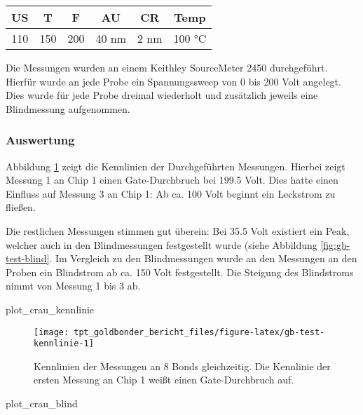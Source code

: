 \documentclass[
  paper=a4,
  ,captions=tableheading
]{scrartcl}
\newenvironment{Shaded}{\begin{snugshade}}{\end{snugshade}}
\newcommand{\NormalTok}[1]{#1}
\begin{document}
\begin{tabular}{c|c|c|c|c|c}
\hline
US & T & F & AU & CR & Temp\\
\hline
110 & 150 & 200 & 40 nm & 2 nm & 100 °C\\
\hline
\end{tabular}

Die Messungen wurden an einem Keithley SourceMeter 2450 durchgeführt. Hierfür wurde an jede Probe ein Spannungssweep von 0 bis 200 Volt angelegt. Dies wurde für jede Probe dreimal wiederholt und zusätzlich jeweils eine Blindmessung aufgenommen.

\hypertarget{auswertung-1}{%
\subsubsection{Auswertung}\label{auswertung-1}}

Abbildung \ref{fig:gb-test-kennlinie} zeigt die Kennlinien der Durchgeführten Messungen. Hierbei zeigt Messung 1 an Chip 1 einen Gate-Durchbruch bei 199.5 Volt. Dies hatte einen Einfluss auf Messung 3 an Chip 1: Ab ca. 100 Volt beginnt ein Leckstrom zu fließen.

Die restlichen Messungen stimmen gut überein: Bei 35.5 Volt existiert ein Peak, welcher auch in den Blindmessungen festgestellt wurde (siehe Abbildung \ref{fig:gb-test-blind}. Im Vergleich zu den Blindmessungen wurde an den Messungen an den Proben ein Blindstrom ab ca. 150 Volt festgestellt. Die Steigung des Blindstroms nimmt von Messung 1 bis 3 ab.

\begin{Shaded}
\begin{Highlighting}[]
\NormalTok{plot_crau_kennlinie}
\end{Highlighting}
\end{Shaded}

\begin{figure}

{\centering \texttt{[image: tpt\_goldbonder\_bericht\_files/figure-latex/gb-test-kennlinie-1]} 

}

\caption{Kennlinien der Messungen an 8 Bonds gleichzeitig. Die Kennlinie der ersten Messung an Chip 1 weißt einen Gate-Durchbruch auf.}\label{fig:gb-test-kennlinie}
\end{figure}

\begin{Shaded}
\begin{Highlighting}[]
\NormalTok{plot_crau_blind}
\end{Highlighting}
\end{Shaded}
\end{document}
